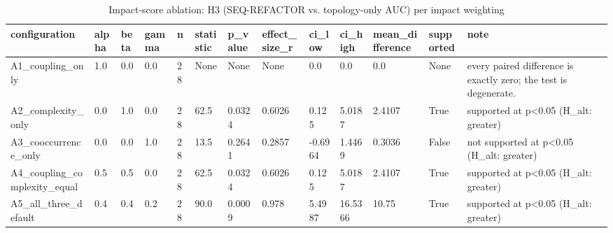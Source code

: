 \begin{table}[t]
\centering
\caption{Impact-score ablation: H3 (SEQ-REFACTOR vs. topology-only AUC) per impact weighting}
\label{tab:impact-ablation}
\begin{tabular}{lllllllllllll}
\toprule
configuration & alpha & beta & gamma & n & statistic & p\_value & effect\_size\_r & ci\_low & ci\_high & mean\_difference & supported & note \\
\midrule
A1\_coupling\_only & 1.0 & 0.0 & 0.0 & 28 & None & None & None & 0.0 & 0.0 & 0.0 & None & every paired difference is exactly zero; the test is degenerate. \\
A2\_complexity\_only & 0.0 & 1.0 & 0.0 & 28 & 62.5 & 0.0324 & 0.6026 & 0.125 & 5.0187 & 2.4107 & True & supported at p<0.05 (H\_alt: greater) \\
A3\_cooccurrence\_only & 0.0 & 0.0 & 1.0 & 28 & 13.5 & 0.2641 & 0.2857 & -0.6964 & 1.4469 & 0.3036 & False & not supported at p<0.05 (H\_alt: greater) \\
A4\_coupling\_complexity\_equal & 0.5 & 0.5 & 0.0 & 28 & 62.5 & 0.0324 & 0.6026 & 0.125 & 5.0187 & 2.4107 & True & supported at p<0.05 (H\_alt: greater) \\
A5\_all\_three\_default & 0.4 & 0.4 & 0.2 & 28 & 90.0 & 0.0009 & 0.978 & 5.4987 & 16.5366 & 10.75 & True & supported at p<0.05 (H\_alt: greater) \\
\bottomrule
\end{tabular}
\end{table}
